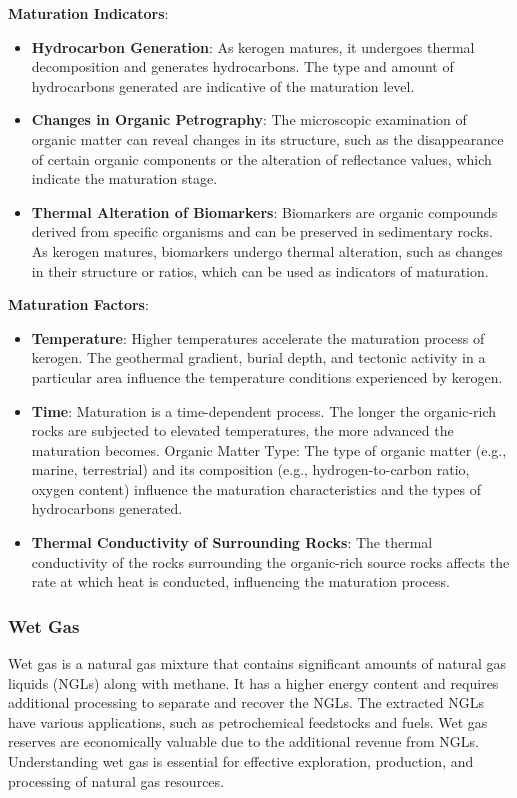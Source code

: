 \documentclass{article}
\begin{document}
\textbf{Maturation Indicators}:
    \begin{itemize}
        \item \textbf{Hydrocarbon Generation}: As kerogen matures, it undergoes thermal decomposition and generates hydrocarbons. The type and amount of hydrocarbons generated are indicative of the maturation level.
        \item \textbf{Changes in Organic Petrography}: The microscopic examination of organic matter can reveal changes in its structure, such as the disappearance of certain organic components or the alteration of reflectance values, which indicate the maturation stage.
        \item \textbf{Thermal Alteration of Biomarkers}: Biomarkers are organic compounds derived from specific organisms and can be preserved in sedimentary rocks. As kerogen matures, biomarkers undergo thermal alteration, such as changes in their structure or ratios, which can be used as indicators of maturation.
    \end{itemize}



\textbf{Maturation Factors}:
    \begin{itemize}
        \item \textbf{Temperature}: Higher temperatures accelerate the maturation process of kerogen. The geothermal gradient, burial depth, and tectonic activity in a particular area influence the temperature conditions experienced by kerogen.
        \item \textbf{Time}: Maturation is a time-dependent process. The longer the organic-rich rocks are subjected to elevated temperatures, the more advanced the maturation becomes.
        Organic Matter Type: The type of organic matter (e.g., marine, terrestrial) and its composition (e.g., hydrogen-to-carbon ratio, oxygen content) influence the maturation characteristics and the types of hydrocarbons generated.
        \item \textbf{Thermal Conductivity of Surrounding Rocks}: The thermal conductivity of the rocks surrounding the organic-rich source rocks affects the rate at which heat is conducted, influencing the maturation process.
    \end{itemize}

    \subsubsection*{Wet Gas}
    Wet gas is a natural gas mixture that contains significant amounts of natural gas liquids (NGLs) along with methane. It has a higher energy content and requires additional processing to separate and recover the NGLs. The extracted NGLs have various applications, such as petrochemical feedstocks and fuels. Wet gas reserves are economically valuable due to the additional revenue from NGLs. Understanding wet gas is essential for effective exploration, production, and processing of natural gas resources.\\ 
\end{document}
